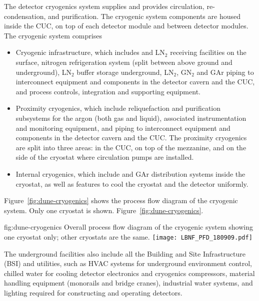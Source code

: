 The detector cryogenics system supplies  and provides
circulation, re-condensation, and purification. The cryogenic system
components are housed inside the CUC, on top of each detector module
and between detector modules. The cryogenic system comprises
\begin{itemize}
\item Cryogenic infrastructure, which includes  and LN$_2$ receiving
  facilities on the surface, nitrogen refrigeration system (split
  between above ground and underground), LN$_2$ buffer storage
  underground, LN$_2$, GN$_2$ and GAr piping to interconnect equipment and
  components in the detector cavern and the CUC, and process controls,
  integration and supporting equipment. 
\item Proximity cryogenics, which include reliquefaction  and
  purification subsystems for the argon (both gas and liquid), associated
  instrumentation and monitoring equipment, and  piping to
  interconnect equipment and components in the detector cavern and the
  CUC. The proximity cryogenics are split into three areas: in the
  CUC, on top of the mezzanine, and on the side of the cryostat 
  where  circulation pumps are installed.
\item Internal cryogenics, which include  and GAr distribution
  systems inside the cryostat, as well as features to cool the
  cryostat and the detector uniformly.
\end{itemize}
Figure~\ref{fig:dune-cryogenics} shows the process flow diagram of the
 cryogenic system. Only one cryostat is shown.
Figure~\ref{fig:dune-cryogenics}.
\begin{dunefigure}{fig:dune-cryogenics}
  {Overall process flow diagram of the cryogenic system showing one
    cryostat only; other cryostats are the same.}
  \texttt{[image: LBNF\_PFD\_180909.pdf]}
\end{dunefigure}


The underground facilities also include all the Building and Site
Infrastructure (BSI) and utilities, such as HVAC systems for
underground environment control, chilled water for cooling detector
electronics and cryogenics compressors, material handling equipment
(monorails and bridge cranes), industrial water systems, and lighting required for constructing and operating detectors.


